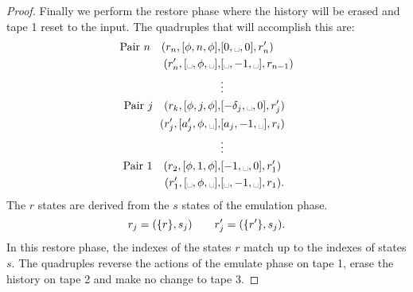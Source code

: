\begin{proof}
	Finally we perform the restore phase where the history will be erased and tape 1 reset to
	the input. The quadruples that will accomplish this are:
	\begin{align*}
	    \text{Pair }n \quad (r_n,[\phi,n,\phi],&[0,\blank,0],r'_n)\\
			(r'_n,[\blank,\phi,\blank],&[\blank,-1,\blank],r_{n-1})\\
			&\vdots\\
	    \text{Pair }\jay \quad (r_\kay,[\phi,\jay,\phi],&[-\delta_\jay,\blank,0],r'_\jay)\\
			(r'_\jay,[a'_\jay,\phi,\blank],&[a_\jay,-1,\blank],r_i)\\
			&\vdots\\
			\text{Pair 1} \quad (r_2,[\phi,1,\phi],&[-1,\blank,0],r'_1)\\
			(r'_1,[\blank,\phi,\blank],&[\blank,-1,\blank],r_1).
	\end{align*}
  The $r$ states are derived from the $s$ states of the emulation phase.
  \[
    r_j = (\{r\},s_j) \qquad    r'_j = (\{r'\}, s_j).
  \]
	In this restore phase, the indexes of the states $r$ match up to the indexes of states $s$. The
	quadruples reverse the actions of the emulate phase on tape 1, erase the history on tape 2 and
	make no change to tape 3.

\end{proof}


